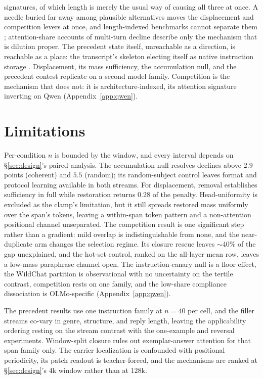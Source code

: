 \documentclass{article}
\begin{document}
signatures, of which length is merely the usual way of causing all three at once. A needle
buried far away among plausible alternatives moves the displacement and competition levers
at once, and length-indexed benchmarks cannot separate them
\citep{hsieh2024ruler}; attention-share accounts of multi-turn decline
\citep{dongre2026attentioncloses} describe only the mechanism that is dilution proper. The
precedent state itself, unreachable as a direction, is reachable as a place: the transcript's
skeleton electing itself as native instruction storage
\citep{darcet2023registers,sun2024massiveactivations,mu2023gist}.
Displacement, its mass sufficiency, the accumulation null, and the precedent contest replicate
on a second model family. Competition is the mechanism that does not: it is
architecture-indexed, its attention signature inverting on Qwen (Appendix~\ref{app:qwen}).

\section{Limitations}
\label{sec:limitations}

Per-condition $n$ is bounded by the window, and every interval depends on
\S\ref{sec:design}'s paired analysis. The accumulation null resolves declines above $2.9$
points (coherent) and $5.5$ (random); its random-subject control leaves format and protocol
learning available in both streams. For displacement, removal establishes sufficiency in full
while restoration returns $0.28$ of the penalty. Head-uniformity is excluded as the clamp's
limitation, but it still spreads restored mass uniformly over the span's tokens, leaving a
within-span token pattern and a non-attention positional channel unseparated. The competition result is one significant step rather than a gradient: mild overlap
is indistinguishable from none, and the near-duplicate arm changes the selection regime.
Its closure rescue leaves ${\sim}40\%$ of the gap unexplained, and the hot-set control,
ranked on the all-layer mean row, leaves a low-mass paraphrase channel open. The instruction-canary null is a floor effect, the WildChat partition is observational with no
uncertainty on the tertile contrast, competition rests on one family, and the low-share
compliance dissociation is OLMo-specific (Appendix~\ref{app:qwen}).

The precedent results use one instruction family at $n{=}40$ per cell, and the filler streams
co-vary in genre, structure, and reply length, leaving the applicability ordering resting on
the stream contrast with the one-example and reversal experiments. Window-split closure rules
out exemplar-answer attention for that span family only. The carrier localization is confounded with
positional periodicity, its patch readout is teacher-forced, and the mechanisms are ranked at
\S\ref{sec:design}'s $4$k window rather than at $128$k.
\end{document}

